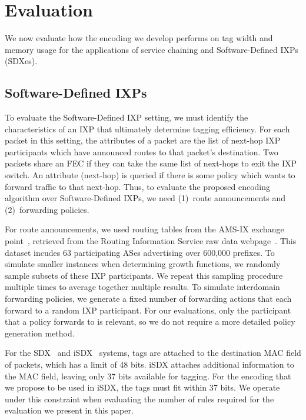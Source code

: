 \section{Evaluation} \label{sec:evaluation}

We  now evaluate how the encoding we develop performs on tag width and
memory usage for the applications of service chaining and Software-Defined IXPs (SDXes).



\subsection{Software-Defined IXPs}
To evaluate the Software-Defined IXP setting, we must identify the
characteristics of an IXP that ultimately determine tagging
efficiency. For each packet in this setting, the attributes of a packet
are the list of next-hop IXP participants which have announced routes to
that packet's destination. Two packets share an FEC if they can take the
same list of next-hops to exit the IXP switch. An attribute (next-hop)
is queried if there is some policy which wants to forward traffic to
that next-hop. Thus, to evaluate the proposed encoding algorithm
over Software-Defined 
IXPs, we need (1)~route announcements and (2)~forwarding policies.  


For route announcements, we used routing tables from the AMS-IX exchange
point~\cite{ams-ix}, retrieved from the Routing Information Service raw
data webpage~\cite{ris}. This dataset incudes 63 participating ASes
advertising over 600,000 prefixes.  
To simulate smaller instances when determining growth functions, we
randomly sample subsets of these IXP participants. We repeat this
sampling procedure multiple times to average together multiple results. 
To simulate interdomain forwarding policies, we generate a fixed number
of forwarding actions that each forward to a random IXP participant. For
our evaluations, only the participant that a policy forwards to is
relevant, so we do not require a more detailed policy generation method.  

For the SDX~\cite{sdx} and iSDX~\cite{isdx} systems, tags are attached to the
destination MAC field of packets, which has a limit of 48 bits.  iSDX
attaches additional information to the MAC field, leaving only 37 bits
available for tagging. For the encoding that we propose to be used in
iSDX, the tags must fit within 37 bits. We operate under this constraint when
evaluating the number of rules required for the evaluation we present in
this paper.

